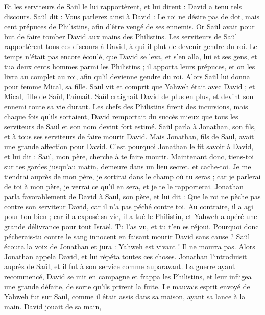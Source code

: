 \begin{multicols}{2}
Et les serviteurs de Saül le lui rapportèrent, et lui dirent : David a tenu tels discours.
Saül dit : Vous parlerez ainsi à David : Le roi ne désire pas de dot, mais cent prépuces de Philistins, afin d'être vengé de ses ennemis. Or Saül avait pour but de faire tomber David aux mains des Philistins.
Les serviteurs de Saül rapportèrent tous ces discours à David, à qui il plut de devenir gendre du roi. Le temps n'était pas encore écoulé,
que David se leva, et s'en alla, lui et ses gens, et tua deux cents hommes parmi les Philistins ; il apporta leurs prépuces, et on les livra au complet au roi, afin qu'il devienne gendre du roi. Alors Saül lui donna pour femme Mical, sa fille.
Saül vit et comprit que Yahweh était avec David ; et Mical, fille de Saül, l'aimait.
Saül craignait David de plus en plus, et devint son ennemi toute sa vie durant.
Les chefs des Philistins firent des incursions, mais chaque fois qu'ils sortaient, David remportait du succès mieux que tous les serviteurs de Saül et son nom devint fort estimé.
\VerseOne{}Saül parla à Jonathan, son fils, et à tous ses serviteurs de faire mourir David.
Mais Jonathan, fils de Saül, avait une grande affection pour David. C'est pourquoi Jonathan le fit savoir à David, et lui dit : Saül, mon père, cherche à te faire mourir. Maintenant donc, tiens-toi sur tes gardes jusqu'au matin, demeure dans un lieu secret, et cache-toi.
Je me tiendrai auprès de mon père, je sortirai dans le champ où tu seras ; car je parlerai de toi à mon père, je verrai ce qu'il en sera, et je te le rapporterai.
Jonathan parla favorablement de David à Saül, son père, et lui dit : Que le roi ne pèche pas contre son serviteur David, car il n'a pas péché contre toi. Au contraire, il a agi pour ton bien ;
car il a exposé sa vie, il a tué le Philistin, et Yahweh a opéré une grande délivrance pour tout Israël. Tu l'as vu, et tu t'en es réjoui. Pourquoi donc pécherais-tu contre le sang innocent en faisant mourir David sans cause ?
Saül écouta la voix de Jonathan et jura : Yahweh est vivant ! Il ne mourra pas.
Alors Jonathan appela David, et lui répéta toutes ces choses. Jonathan l'introduisit auprès de Saül, et il fut à son service comme auparavant.
La guerre ayant recommencé, David se mit en campagne et frappa les Philistins, et leur infligea une grande défaite, de sorte qu'ils prirent la fuite.
Le mauvais esprit envoyé de Yahweh fut sur Saül, comme il était assis dans sa maison, ayant sa lance à la main. David jouait de sa main,

\end{multicols}
